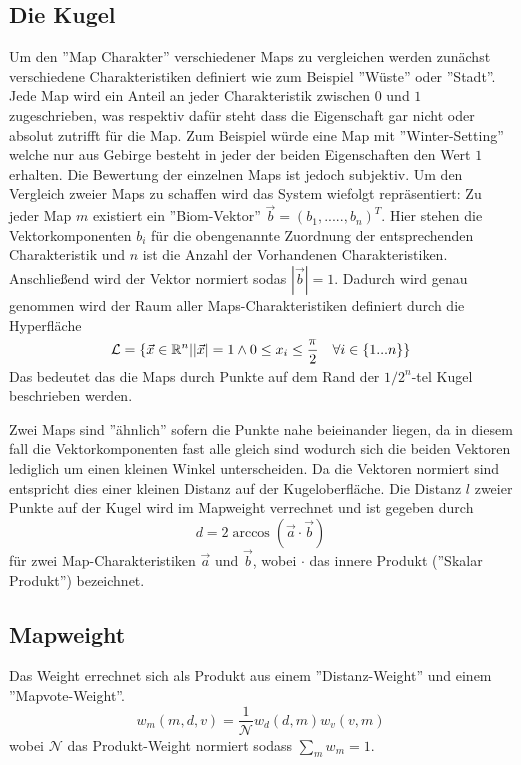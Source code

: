         \subsection{Die Kugel}
    Um den ''Map Charakter'' verschiedener Maps zu vergleichen werden zunächst verschiedene Charakteristiken definiert wie zum Beispiel ''Wüste'' oder ''Stadt''.
    Jede Map wird ein Anteil an jeder Charakteristik zwischen $0$ und $1$ zugeschrieben, was respektiv dafür steht dass die Eigenschaft gar nicht oder absolut zutrifft für die Map.
    Zum Beispiel würde eine Map mit ''Winter-Setting'' welche nur aus Gebirge besteht in jeder der beiden Eigenschaften den Wert $1$ erhalten. 
    Die Bewertung der einzelnen Maps ist jedoch subjektiv.
    Um den Vergleich zweier Maps zu schaffen wird das System wiefolgt repräsentiert:
    Zu jeder Map $m$ existiert ein ''Biom-Vektor'' $\vec{b} = (b_1,.....,b_n)^T$. 
    Hier stehen die Vektorkomponenten $b_i$ für die obengenannte Zuordnung der entsprechenden Charakteristik und $n$ ist die Anzahl der Vorhandenen Charakteristiken.
    Anschließend wird der Vektor normiert sodas $|\vec{b}|=1$.
    Dadurch wird genau genommen wird der Raum aller Maps-Charakteristiken definiert durch die Hyperfläche
    \begin{equation*}
        \mathcal{L} = \{\vec{x}\in\mathbb{R}^n ||\vec{x}|=1 \land 0\leq x_i \leq \smash{\frac{\pi}{2}} \quad \forall i\in\{1...n\}\}
    \end{equation*}
    Das bedeutet das die Maps durch Punkte auf dem Rand der $1/2^n$-tel Kugel beschrieben werden.

    Zwei Maps sind ''ähnlich'' sofern die Punkte nahe beieinander liegen, da in diesem fall die Vektorkomponenten fast alle gleich sind wodurch sich die beiden Vektoren lediglich um einen kleinen Winkel unterscheiden.
    Da die Vektoren normiert sind entspricht dies einer kleinen Distanz auf der Kugeloberfläche.
    Die Distanz $l$ zweier Punkte auf der Kugel wird im Mapweight verrechnet und ist gegeben durch 
    \begin{equation}
        d = 2\arccos(\vec{a}\cdot\vec{b})
    \end{equation}
    für zwei Map-Charakteristiken $\vec{a}$ und $\vec{b}$, wobei $\cdot$ das innere Produkt (''Skalar Produkt'') bezeichnet. 
    \subsection{Mapweight}
    Das Weight errechnet sich als Produkt aus einem ''Distanz-Weight'' und einem ''Mapvote-Weight''. 
    \begin{equation}
        w_m(m,d,v) = \frac{1}{\mathcal{N}}w_d(d,m)w_v(v,m)
    \end{equation}
    wobei $\mathcal{N}$ das Produkt-Weight normiert sodass $\sum_m w_m = 1$.
